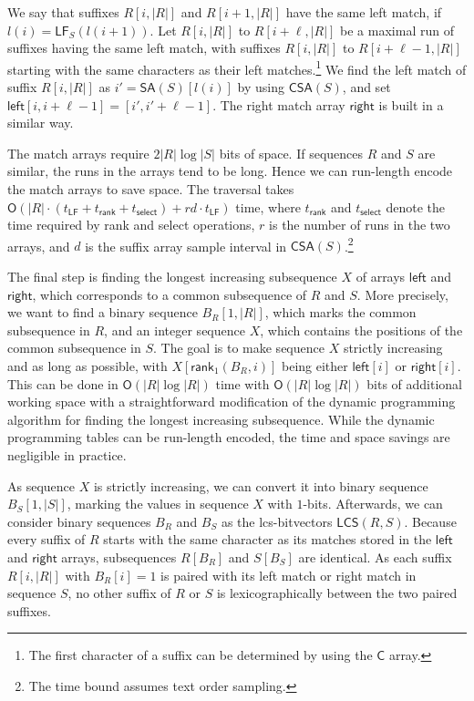 \documentclass[a4paper,11pt]{llncs}
\newcommand{\abs}[1]{\ensuremath{\lvert #1 \rvert}}
\newcommand{\mSA}{\ensuremath{\mathsf{SA}}}
\newcommand{\mCSA}{\ensuremath{\mathsf{CSA}}}
\newcommand{\mC}{\ensuremath{\mathsf{C}}}
\newcommand{\mLCS}{\ensuremath{\mathsf{LCS}}}
\newcommand{\mleft}{\ensuremath{\mathsf{left}}}
\newcommand{\mright}{\ensuremath{\mathsf{right}}}
\newcommand{\rank}{\textsf{rank}}
\newcommand{\select}{\textsf{select}}
\newcommand{\mLF}{\ensuremath{\mathsf{LF}}}
\newcommand{\mrank}{\ensuremath{\mathsf{rank}}}
\newcommand{\mselect}{\ensuremath{\mathsf{select}}}
\newcommand{\Oh}{\ensuremath{\mathsf{O}}}
\newcommand{\onebit}{$1$\nobreakdash-bit}
\begin{document}
We say that suffixes $R[i,\abs{R}]$ and $R[i+1,\abs{R}]$ have the same left match, if $l(i) = \mLF_{S}(l(i+1))$. Let $R[i,\abs{R}]$ to $R[i+\ell,\abs{R}]$ be a maximal run of suffixes having the same left match, with suffixes $R[i,\abs{R}]$ to $R[i+\ell-1,\abs{R}]$ starting with the same characters as their left matches.\footnote{The first character of a suffix can be determined by using the $\mC$ array.} We find the left match of suffix $R[i,\abs{R}]$ as $i' = \mSA(S)[l(i)]$ by using $\mCSA(S)$, and set $\mleft[i,i+\ell-1] = [i',i'+\ell-1]$. The right match array $\mright$ is built in a similar way.

The match arrays require $2\abs{R} \log \abs{S}$ bits of space. If sequences $R$ and $S$ are similar, the runs in the arrays tend to be long. Hence we can run-length encode the match arrays to save space. The traversal takes $\Oh(\abs{R} \cdot (t_{\mLF} + t_{\mrank} + t_{\mselect}) + rd \cdot t_{\mLF})$ time, where $t_{\mrank}$ and $t_{\mselect}$ denote the time required by \rank{} and \select{} operations, $r$ is the number of runs in the two arrays, and $d$ is the suffix array sample interval in $\mCSA(S)$.\footnote{The time bound assumes text order sampling.}

The final step is finding the longest increasing subsequence $X$ of arrays $\mleft$ and $\mright$, which corresponds to a common subsequence of $R$ and $S$. More precisely, we want to find a binary sequence $B_{R}[1,\abs{R}]$, which marks the common subsequence in $R$, and an integer sequence $X$, which contains the positions of the common subsequence in $S$. The goal is to make sequence $X$ strictly increasing and as long as possible, with $X[\mrank_{1}(B_{R}, i)]$ being either $\mleft[i]$ or $\mright[i]$. This can be done in $\Oh(\abs{R} \log \abs{R})$ time with $\Oh(\abs{R} \log \abs{R})$ bits of additional working space with a straightforward modification of the dynamic programming algorithm for finding the longest increasing subsequence. While the dynamic programming tables can be run-length encoded, the time and space savings are negligible in practice.

As sequence $X$ is strictly increasing, we can convert it into binary sequence $B_{S}[1,\abs{S}]$, marking the values in sequence $X$ with \onebit{}s. Afterwards, we can consider binary sequences $B_{R}$ and $B_{S}$ as the lcs-bitvectors $\mLCS(R,S)$. Because every suffix of $R$ starts with the same character as its matches stored in the $\mleft$ and $\mright$ arrays, subsequences $R[B_{R}]$ and $S[B_{S}]$ are identical. As each suffix $R[i,\abs{R}]$ with $B_{R}[i] = 1$ is paired with its left match or right match in sequence $S$, no other suffix of $R$ or $S$ is lexicographically between the two paired suffixes.
\end{document}

